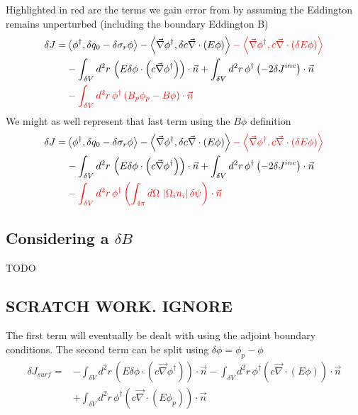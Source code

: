 \documentclass{article}
\newcommand{\bra}{\left\langle}
\newcommand{\ket}{\right\rangle}
\newcommand{\vdiv}{\vec{\nabla} \cdot}
\newcommand{\vgrad}{\vec{\nabla}}
\begin{document}
Highlighted in red are the terms we gain error from by assuming the Eddington remains unperturbed (including the boundary Eddington B)
\begin{align*}
\delta J =& \bra \phi^\dag , \delta q_0 - \delta \sigma_r \phi \ket -  \bra \vgrad \phi^\dag ,  \delta c \vdiv \left( E \phi  \right) \ket  \begingroup\color{red} - \bra \vgrad \phi^\dag ,  c \vdiv \left( \delta E \phi \right)   \ket \endgroup\\
&- \int_{\delta V} d^2 r \, \left( E \delta \phi \cdot \left( c  \vgrad \phi^\dag \right)\right) \cdot \vec{n} 
+ \int_{\delta V} d^2 r \, \phi^\dag \left(-2\delta J^{inc} \right) \cdot \vec{n} \\
& \begingroup\color{red} - \int_{\delta V} d^2 r \, \phi^\dag \left( B_p \phi_p - B \phi \right) \cdot \vec{n} \endgroup
\end{align*}
We might as well represent that last term using the $B\phi$ definition
\begin{align*}
\delta J =& \bra \phi^\dag , \delta q_0 - \delta \sigma_r \phi \ket -  \bra \vgrad \phi^\dag ,  \delta c \vdiv \left( E \phi  \right) \ket  \begingroup\color{red} - \bra \vgrad \phi^\dag ,  c \vdiv \left( \delta E \phi \right)   \ket \endgroup\\
&- \int_{\delta V} d^2 r \, \left( E \delta \phi \cdot \left( c  \vgrad \phi^\dag \right)\right) \cdot \vec{n} 
+ \int_{\delta V} d^2 r \, \phi^\dag \left(-2\delta J^{inc} \right) \cdot \vec{n} \\
& \begingroup\color{red} - \int_{\delta V} d^2 r \, \phi^\dag \left( \int_{4 \pi} d\Omega \, \left| \Omega_i n_i \right | \delta \psi \right) \cdot \vec{n} \endgroup
\end{align*}

\subsection{Considering a $\delta B$}
TODO

\subsection{SCRATCH WORK. IGNORE}
The first term will eventually be dealt with using the adjoint boundary conditions. The second term can be split using $\delta \phi = \phi_p - \phi$
\begin{align*}
\delta J_{surf} =& - \int_{\delta V} d^2 r \, \left( E \delta \phi \cdot \left( c  \vgrad \phi^\dag \right)\right) \cdot \vec{n} - \int_{\delta V} d^2 r \, \phi^\dag \left( c \vdiv \left( E \phi \right) \right) \cdot \vec{n}\\
& 
+ \int_{\delta V} d^2 r \, \phi^\dag \left( c \vdiv \left( E \phi_p \right) \right) \cdot \vec{n}
\end{align*}
\end{document}
